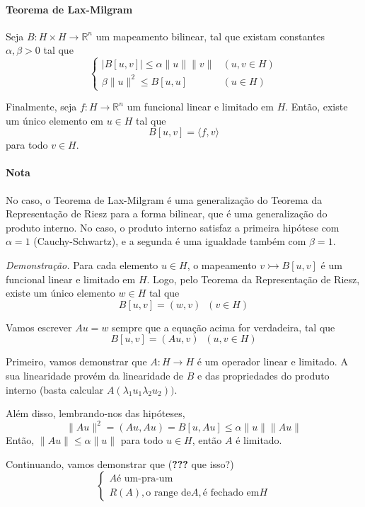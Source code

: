 \documentclass[a4paper, 11pt]{book}
\begin{document}
\paragraph{Teorema de Lax-Milgram}\label{t:eliptic-lax-milgram}

Seja $B: H \times H \rightarrow {\mathbb{R}^n}$ um mapeamento bilinear, tal que existam constantes $\alpha, \beta > 0$ tal que 
\[
\begin{cases}
	| B[u,v] | \leq \alpha \|u\| \|v\| & (u,v \in H) \\
	\beta \|u\|^2 \leq B[u,u] & (u \in H)
\end{cases}	
\]

Finalmente, seja $f: H \rightarrow {\mathbb{R}^n}$ um funcional linear e limitado em $H$. Então, existe um único elemento em $u \in H$ tal que
\[
	B[u,v] = \langle f, v \rangle	
\]
para todo $v \in H$.

\paragraph*{Nota} No caso, o Teorema de Lax-Milgram é  uma generalização do Teorema da Representação de Riesz para a forma bilinear, que é uma generalização do produto interno. No caso, o produto interno satisfaz a primeira hipótese com $\alpha=1$ (Cauchy-Schwartz), e a segunda é uma igualdade também com $\beta=1$.

\textit{Demonstração.} Para cada elemento $u \in H$, o mapeamento $v \rightarrowtail B[u,v]$ é um funcional linear e limitado em $H$. Logo, pelo Teorema da Representação de Riesz, existe um único elemento $w \in H$ tal que
\[
	B[u,v] = (w,v) \;\; (v \in H)
\]

Vamos escrever $Au=w$ sempre que a equação acima for verdadeira, tal que
\[
	B[u,v] = (Au, v) \;\; (u, v \in H)	
\]

Primeiro, vamos demonstrar que $A: H \rightarrow H$ é um operador linear e limitado. A sua linearidade provém da linearidade de $B$ e das propriedades do produto interno (basta calcular $A(\lambda_1u_1 \lambda_2u_2))$.

Além disso, lembrando-nos das hipóteses,
\[
	\|Au\|^2 = (Au, Au) = B[u, Au] \leq \alpha \|u\| \| Au\|
\]
Então, $\| Au \| \leq \alpha \| u \|$ para todo $u \in H$, então $A$ é limitado. 

Continuando, vamos demonstrar que (\textbf{???} que isso?)
\[\begin{cases}
	A \text{é um-pra-um } \\
	R(A), \text{o range de} A, \text{é fechado em} H
\end{cases}\]
\end{document}

